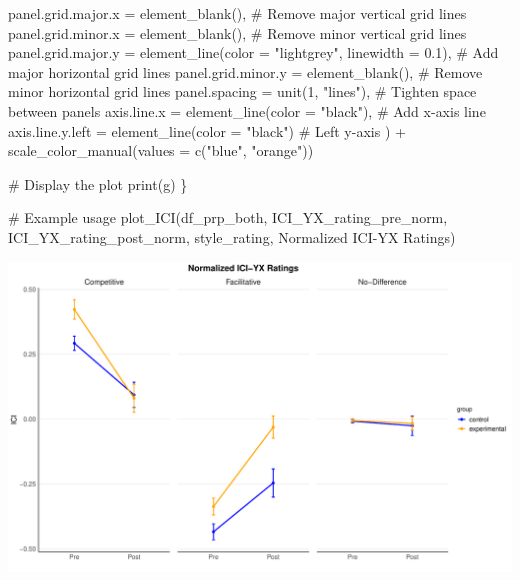 \documentclass[
  letterpaper,
  DIV=11,
  numbers=noendperiod]{scrartcl}
\newenvironment{Shaded}{\begin{snugshade}}{\end{snugshade}}
\newcommand{\AttributeTok}[1]{\textcolor[rgb]{0.40,0.45,0.13}{#1}}
\newcommand{\CommentTok}[1]{\textcolor[rgb]{0.37,0.37,0.37}{#1}}
\newcommand{\DecValTok}[1]{\textcolor[rgb]{0.68,0.00,0.00}{#1}}
\newcommand{\FloatTok}[1]{\textcolor[rgb]{0.68,0.00,0.00}{#1}}
\newcommand{\FunctionTok}[1]{\textcolor[rgb]{0.28,0.35,0.67}{#1}}
\newcommand{\NormalTok}[1]{\textcolor[rgb]{0.00,0.23,0.31}{#1}}
\newcommand{\SpecialCharTok}[1]{\textcolor[rgb]{0.37,0.37,0.37}{#1}}
\newcommand{\StringTok}[1]{\textcolor[rgb]{0.13,0.47,0.30}{#1}}
\begin{document}
\begin{Shaded}
\begin{Highlighting}[]
      \AttributeTok{panel.grid.major.x =} \FunctionTok{element\_blank}\NormalTok{(),  }\CommentTok{\# Remove major vertical grid lines}
      \AttributeTok{panel.grid.minor.x =} \FunctionTok{element\_blank}\NormalTok{(),  }\CommentTok{\# Remove minor vertical grid lines}
      \AttributeTok{panel.grid.major.y =} \FunctionTok{element\_line}\NormalTok{(}\AttributeTok{color =} \StringTok{"lightgrey"}\NormalTok{, }\AttributeTok{linewidth =} \FloatTok{0.1}\NormalTok{),  }\CommentTok{\# Add major horizontal grid lines}
      \AttributeTok{panel.grid.minor.y =} \FunctionTok{element\_blank}\NormalTok{(),  }\CommentTok{\# Remove minor horizontal grid lines}
      \AttributeTok{panel.spacing =} \FunctionTok{unit}\NormalTok{(}\DecValTok{1}\NormalTok{, }\StringTok{"lines"}\NormalTok{),  }\CommentTok{\# Tighten space between panels}
      \AttributeTok{axis.line.x =} \FunctionTok{element\_line}\NormalTok{(}\AttributeTok{color =} \StringTok{"black"}\NormalTok{),  }\CommentTok{\# Add x{-}axis line}
      \AttributeTok{axis.line.y.left =} \FunctionTok{element\_line}\NormalTok{(}\AttributeTok{color =} \StringTok{"black"}\NormalTok{)  }\CommentTok{\# Left y{-}axis}
\NormalTok{    ) }\SpecialCharTok{+}
    \FunctionTok{scale\_color\_manual}\NormalTok{(}\AttributeTok{values =} \FunctionTok{c}\NormalTok{(}\StringTok{"blue"}\NormalTok{, }\StringTok{"orange"}\NormalTok{)) }

  \CommentTok{\# Display the plot}
  \FunctionTok{print}\NormalTok{(g)}
\NormalTok{\}}

\CommentTok{\# Example usage}
\FunctionTok{plot\_ICI}\NormalTok{(df\_prp\_both, }\StringTok{\textquotesingle{}ICI\_YX\_rating\_pre\_norm\textquotesingle{}}\NormalTok{, }\StringTok{\textquotesingle{}ICI\_YX\_rating\_post\_norm\textquotesingle{}}\NormalTok{, }\StringTok{\textquotesingle{}style\_rating\textquotesingle{}}\NormalTok{, }\StringTok{\textquotesingle{}Normalized ICI{-}YX Ratings\textquotesingle{}}\NormalTok{)}
\end{Highlighting}
\end{Shaded}

\includegraphics{index_files/figure-pdf/unnamed-chunk-44-1.pdf}
\end{document}
